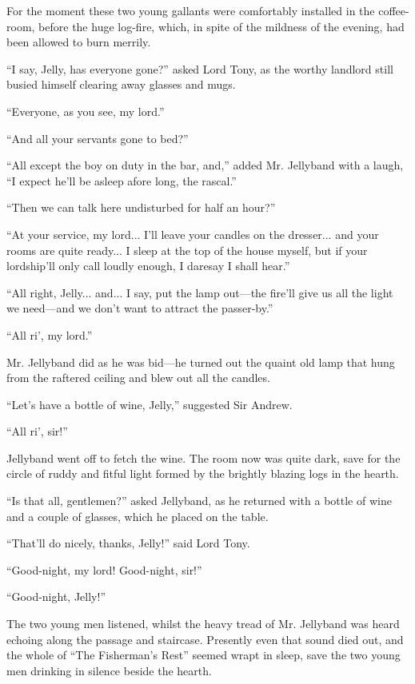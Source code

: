 \documentclass[paper=5.5in:8.5in,BCOR=7mm,twoside,DIV=calc,12pt,usegeometry,chapterprefix,endperiod,headings=big]{scrbook}
\begin{document}
For the moment these two young gallants were comfortably installed in the coffee-room, before the huge log-fire, which, in spite of the mildness of the evening, had been allowed to burn merrily.

\enquote{I say, Jelly, has everyone gone?} asked Lord Tony, as the worthy landlord still busied himself clearing away glasses and mugs.

\enquote{Everyone, as you see, my lord.}

\enquote{And all your servants gone to bed?}

\enquote{All except the boy on duty in the bar, and,} added Mr. Jellyband with a laugh, \enquote{I expect he'll be asleep afore long, the rascal.}

\enquote{Then we can talk here undisturbed for half an hour?}

\enquote{At your service, my lord... I'll leave your candles on the dresser... and your rooms are quite ready... I sleep at the top of the house myself, but if your lordship'll only call loudly enough, I daresay I shall hear.}

\enquote{All right, Jelly... and... I say, put the lamp out---the fire'll give us all the light we need---and we don't want to attract the passer-by.}

\enquote{All ri’, my lord.}

Mr. Jellyband did as he was bid---he turned out the quaint old lamp that hung from the raftered ceiling and blew out all the candles.

\enquote{Let's have a bottle of wine, Jelly,} suggested Sir Andrew.

\enquote{All ri’, sir!}

Jellyband went off to fetch the wine. The room now was quite dark, save for the circle of ruddy and fitful light formed by the brightly blazing logs in the hearth.

\enquote{Is that all, gentlemen?} asked Jellyband, as he returned with a bottle of wine and a couple of glasses, which he placed on the table.

\enquote{That'll do nicely, thanks, Jelly!} said Lord Tony.

\enquote{Good-night, my lord! Good-night, sir!}

\enquote{Good-night, Jelly!}

The two young men listened, whilst the heavy tread of Mr. Jellyband was heard echoing along the passage and staircase. Presently even that sound died out, and the whole of \enquote{The Fisherman's Rest} seemed wrapt in sleep, save the two young men drinking in silence beside the hearth.
\end{document}
